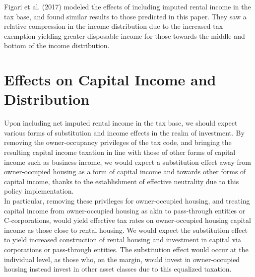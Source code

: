\documentclass[12pt]{extarticle}
\begin{document}
  Figari et al. (2017) modeled the effects of including imputed rental income in the tax base, and found similar results to those predicted in this paper. They saw a relative compression in the income distribution due to the increased tax exemption yielding greater disposable income for those towards the middle and bottom of the income distribution.\supercite{figari__2017}
  \section*{Effects on Capital Income and Distribution}%
  Upon including net imputed rental income in the tax base, we should expect various forms of substitution and income effects in the realm of investment. By removing the owner-occupancy privileges of the tax code, and bringing the resulting capital income taxation in line with those of other forms of capital income such as business income, we would expect a substitution effect away from owner-occupied housing as a form of capital income and towards other forms of capital income, thanks to the establishment of effective neutrality due to this policy implementation.\\

  In particular, removing these privileges for owner-occupied housing, and treating capital income from owner-occupied housing as akin to pass-through entities or C-corporations, would yield effective tax rates on owner-occupied housing capital income as those close to rental housing.\supercite{effective_rates} We would expect the substitution effect to yield increased construction of rental housing and investment in capital via corporations or pass-through entities. The substitution effect would occur at the individual level, as those who, on the margin, would invest in owner-occupied housing instead invest in other asset classes due to this equalized taxation.\\
\end{document}
